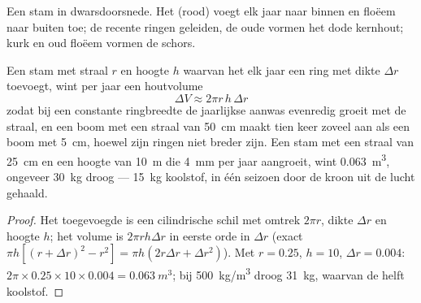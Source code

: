 \begin{omfigure}

{\small Een stam in dwarsdoorsnede. Het  (rood) voegt elk jaar 
naar binnen en floëem naar buiten toe; de recente ringen geleiden, de oude
vormen het dode kernhout; kurk en oud floëem vormen de schors.}
\end{omfigure}

\begin{theorem}\label{thm:b2:plant-meristems:rings}
Een stam met straal $r$ en hoogte $h$ waarvan het  elk jaar een ring
met dikte $\Delta r$ toevoegt, wint per jaar een houtvolume
\[
\Delta V \approx 2\pi r\,h\,\Delta r
\]
zodat bij een constante ringbreedte de jaarlijkse aanwas evenredig groeit met
de straal, en een boom met een straal van \qty{50}{cm} maakt tien keer zoveel
 aan als een boom met \qty{5}{cm}, hoewel zijn ringen niet breder zijn.
Een stam met een straal van \qty{25}{cm} en een hoogte van \qty{10}{m} die
\qty{4}{mm} per jaar aangroeit, wint \qty{0.063}{m^3}, ongeveer \qty{30}{kg}
droog  --- \qty{15}{kg} koolstof, in één seizoen door de kroon uit de
lucht gehaald.
\end{theorem}
\begin{proof}
Het toegevoegde  is een cilindrische schil met omtrek $2\pi r$, dikte
$\Delta r$ en hoogte $h$; het volume is $2\pi r h\Delta r$ in eerste orde in
$\Delta r$ (exact $\pi h[(r + \Delta r)^2 - r^2]
= \pi h(2r\Delta r + \Delta r^2)$). Met $r = 0.25$, $h = 10$,
$\Delta r = 0.004$: $2\pi\times 0.25\times 10\times 0.004 =
\qty{0.063}{m^3}$; bij \qty{500}{kg/m^3} droog \qty{31}{kg}, waarvan de
helft koolstof.
\end{proof}


